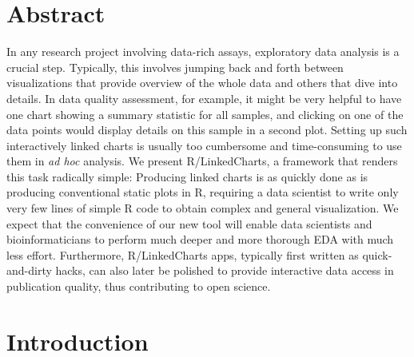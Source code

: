 \documentclass[twocolumn,10pt]{article}
\begin{document}
\setcounter{secnumdepth}{0}



\section{Abstract}
In any research project involving data-rich assays, exploratory data analysis is a crucial step. Typically, this involves jumping back and forth between visualizations that provide overview of the whole data and others that dive into details. In data quality assessment, for example, it might be very helpful to have one chart showing a summary statistic for all samples, and clicking on one of the data points would display details on this sample in a second plot. Setting up such interactively linked charts is usually too cumbersome and time-consuming to use them in \emph{ad hoc} analysis. We present R/LinkedCharts, a framework that renders this task radically simple: Producing linked charts is as quickly done as is producing conventional static plots in R, requiring a data scientist to write only very few lines of simple R code to obtain complex and general visualization. We expect that the convenience of our new tool will enable data scientists and bioinformaticians to perform much deeper and more thorough EDA with much less effort. Furthermore, R/LinkedCharts apps, typically first written as quick-and-dirty hacks, can also later be polished to provide interactive data access in publication quality, thus contributing to open science.

\section{Introduction}
\end{document}
